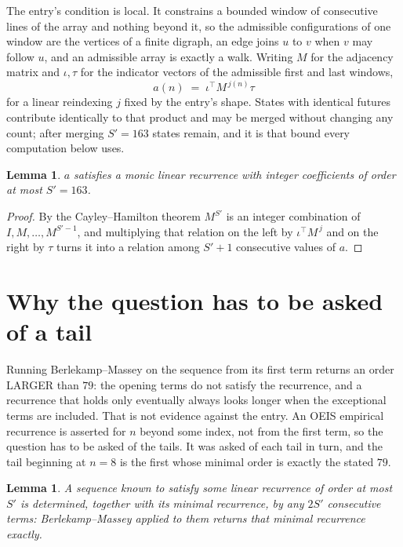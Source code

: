 \documentclass[11pt,a4paper]{article}
\theoremstyle{plain}
\newtheorem{lemma}[theorem]{Lemma}
\theoremstyle{definition}
\begin{document}
The entry's condition is local. It constrains a bounded window of consecutive lines of the
array and nothing beyond it, so the admissible configurations of one window are the vertices of
a finite digraph, an edge joins $u$ to $v$ when $v$ may follow $u$, and an admissible array is
exactly a walk. Writing $M$ for the adjacency matrix and $\iota,\tau$ for the indicator vectors
of the admissible first and last windows,
\[
a(n)\;=\;\iota^{\!\top}M^{\,j(n)}\tau
\]
for a linear reindexing $j$ fixed by the entry's shape. States with identical futures
contribute identically to that product and may be merged without changing any count; after
merging $S'=163$ states remain, and it is that bound every computation below uses.

\begin{lemma}\label{lem:cf}
$a$ satisfies a monic linear recurrence with integer coefficients of order at most $S'=163$.
\end{lemma}

\begin{proof}
By the Cayley--Hamilton theorem $M^{S'}$ is an integer combination of $I,M,\dots,M^{S'-1}$,
and multiplying that relation on the left by $\iota^{\!\top}M^{\,j}$ and on the right by
$\tau$ turns it into a relation among $S'+1$ consecutive values of $a$.
\end{proof}

\section{Why the question has to be asked of a tail}

Running Berlekamp--Massey on the sequence from its first term returns an order LARGER than $79$: the opening terms do not satisfy the recurrence, and a recurrence that holds only eventually always looks longer when the exceptional terms are included. That is not evidence against the entry. An OEIS empirical recurrence is asserted for $n$ beyond some index, not from the first term, so the question has to be asked of the tails. It was asked of each tail in turn, and the tail beginning at $n=8$ is the first whose minimal order is exactly the stated $79$.

\begin{lemma}\label{lem:bm}
A sequence known to satisfy some linear recurrence of order at most $S'$ is determined,
together with its minimal recurrence, by any $2S'$ consecutive terms: Berlekamp--Massey applied
to them returns that minimal recurrence exactly.
\end{lemma}
\end{document}
